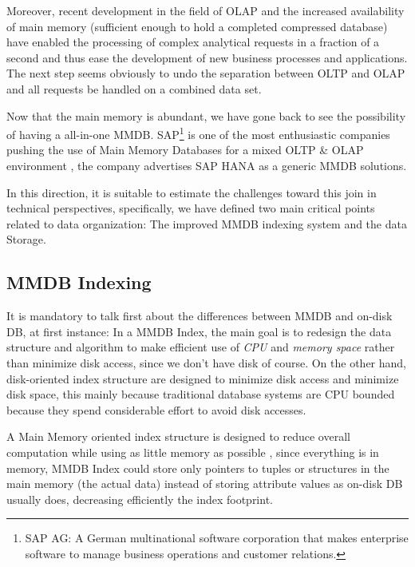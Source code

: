 \documentclass[10pt]{article} %
\begin{document}
    Moreover, recent development in the field of OLAP and the increased availability of main memory (sufficient enough to hold a completed compressed database) have enabled the processing of complex analytical requests in a fraction of a second and thus ease the development of new business processes and applications. The next step seems obviously to undo the separation between OLTP and OLAP and all requests be handled on a combined data set.


    Now that the main memory is abundant, we have gone back to see the possibility of having a all-in-one MMDB. SAP\footnote{SAP AG: A German multinational software corporation that makes enterprise software to manage business operations and customer relations.} is one of the most enthusiastic companies pushing the use of Main Memory Databases for a mixed OLTP \& OLAP environment \cite{Plattner}, the company advertises SAP HANA as a generic MMDB solutions. 
    
    In this direction, it is suitable to estimate the challenges toward this join in technical perspectives, specifically, we have defined two main critical points related to data organization: The improved MMDB indexing system and the data Storage.

    
\subsection{MMDB Indexing}
It is mandatory to talk first about the differences between MMDB and on-disk DB, at first instance: In a MMDB Index, the main goal is to redesign the data structure and algorithm to make efficient use of \emph{ CPU } and \emph{ memory space } rather than minimize disk access, since we don't have disk of course. On the other hand, disk-oriented index structure are designed to minimize disk access and minimize disk space, this mainly because traditional database systems are CPU bounded because they spend considerable effort to avoid disk accesses.

A Main Memory oriented index structure is designed to reduce overall computation while using as little memory as possible \cite{lehman1986study}, since everything is in memory, MMDB Index could store only pointers to tuples or structures in the main memory (the actual data) instead of storing attribute values as on-disk DB usually does, decreasing efficiently the index footprint.
\end{document}

